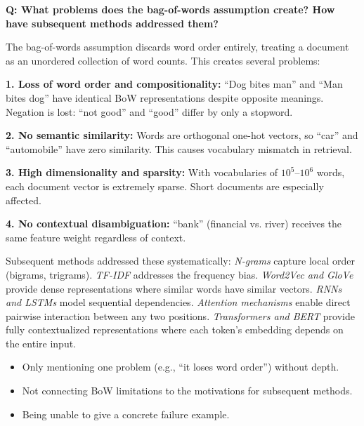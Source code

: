 \begin{interviewq}
\textbf{Q: What problems does the bag-of-words assumption create? How have subsequent methods addressed them?}

 \quad {} \quad \badgefreq{\freqmed}

\stronganswer
The bag-of-words assumption discards word order entirely, treating a document as an
unordered collection of word counts. This creates several problems:

\textbf{1. Loss of word order and compositionality:} ``Dog bites man'' and ``Man bites
dog'' have identical BoW representations despite opposite meanings. Negation is lost:
``not good'' and ``good'' differ by only a stopword.

\textbf{2. No semantic similarity:} Words are orthogonal one-hot vectors, so ``car'' and
``automobile'' have zero similarity. This causes vocabulary mismatch in retrieval.

\textbf{3. High dimensionality and sparsity:} With vocabularies of $10^5$--$10^6$ words,
each document vector is extremely sparse. Short documents are especially affected.

\textbf{4. No contextual disambiguation:} ``bank'' (financial vs. river) receives the
same feature weight regardless of context.

Subsequent methods addressed these systematically: \emph{N-grams} capture local order
(bigrams, trigrams). \emph{TF-IDF} addresses the frequency bias. \emph{Word2Vec and GloVe}
provide dense representations where similar words have similar vectors. \emph{RNNs and
LSTMs} model sequential dependencies. \emph{Attention mechanisms} enable direct pairwise
interaction between any two positions. \emph{Transformers and BERT} provide fully
contextualized representations where each token's embedding depends on the entire input.

\redflags
\begin{itemize}
    \item Only mentioning one problem (e.g., ``it loses word order'') without depth.
    \item Not connecting BoW limitations to the motivations for subsequent methods.
    \item Being unable to give a concrete failure example.
\end{itemize}



\end{interviewq}
